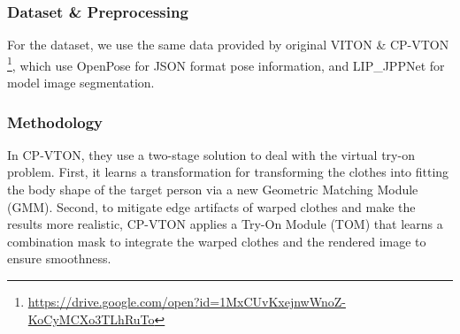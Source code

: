 \documentclass{article}
\begin{document}
\subsubsection{Dataset \& Preprocessing}
For the dataset, we use the same data provided by original VITON \& CP-VTON \footnote{\url{https://drive.google.com/open?id=1MxCUvKxejnwWnoZ-KoCyMCXo3TLhRuTo}}, which use OpenPose\cite{cao2018openpose} for JSON format pose information, and LIP\_JPPNet\cite{liang2018look} for model image segmentation.

\subsubsection{Methodology}
In CP-VTON, they use a two-stage solution to deal with the virtual try-on problem. First, it learns a transformation for transforming the clothes into fitting the body shape of the target person via a new Geometric Matching Module (GMM). Second, to mitigate edge artifacts of warped clothes and make the results more realistic, CP-VTON applies a Try-On Module (TOM) that learns a combination mask to integrate the warped clothes and the  rendered image to ensure smoothness.\\
\end{document}
